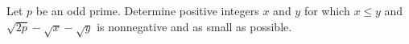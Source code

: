 Let $p$ be an odd prime. Determine positive integers $x$ and $y$ for which $x \leq y$ and $\sqrt{2p} - \sqrt{x} - \sqrt{y}$ is nonnegative and as small as possible.
